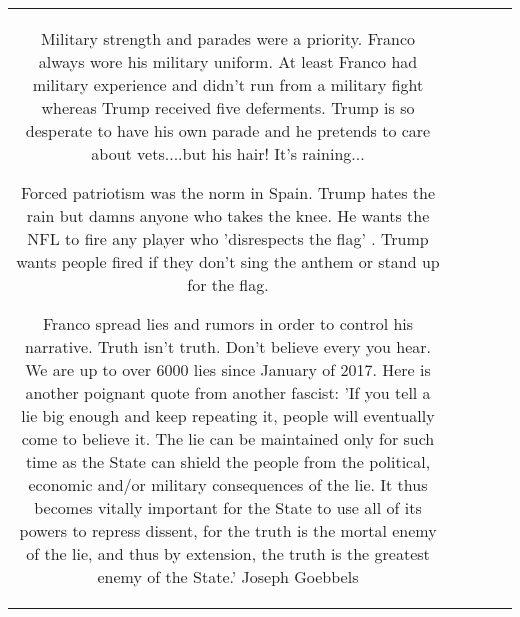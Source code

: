\documentclass[11pt]{article}
\newlength\mylength
\begin{document}
\begin{center}
\begin{longtable}{|C{.65\mylength}|C{.30\mylength}|C{.12\mylength}|C{.12\mylength}|C{.12\mylength}|}
 Military strength and parades were a priority. Franco always wore his military uniform. At least Franco had military experience and didn't run from a military fight whereas Trump received five deferments. Trump is so desperate to have his own parade and he pretends to care about vets....but his hair! It's raining...

Forced patriotism was the norm in Spain.  Trump hates the rain but damns anyone who takes the knee. He wants the NFL to fire any player who 'disrespects the flag' . 
Trump wants people fired if they don't sing the anthem or stand up for the flag. 

Franco spread lies and rumors in order to control his narrative. 
Truth isn't truth. Don't believe every you hear. We are up to over 6000 lies since January of 2017. 
Here is another poignant quote from another fascist: 'If you tell a lie big enough and keep repeating it, people will eventually come to believe it. The lie can be maintained only for such time as the State can shield the people from the political, economic and/or military consequences of the lie. It thus becomes vitally important for the State to use all of its powers to repress dissent, for the truth is the mortal enemy of the lie, and thus by extension, the truth is the greatest enemy of the State.'
Joseph Goebbels



\end{longtable}
\end{center}
\end{document}
